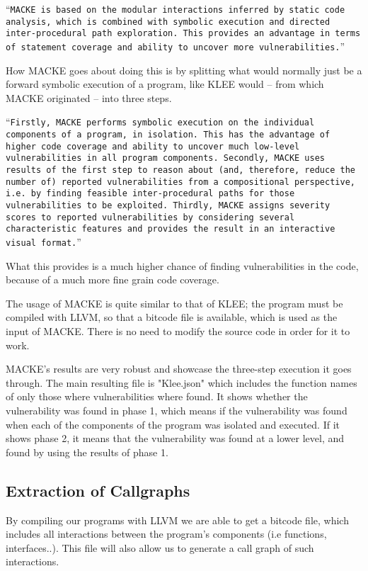 \enquote{\texttt{MACKE is based on the modular interactions inferred
		by static code analysis, which is combined with symbolic execution and directed inter-procedural path exploration. This
		provides an advantage in terms of statement coverage and
		ability to uncover more vulnerabilities.}}\parencite{ognawala}

How MACKE goes about doing this is by splitting what would normally just be a forward symbolic execution of a program, like KLEE would -- from which MACKE originated -- into three steps.

\enquote{\texttt{Firstly,
		MACKE performs symbolic execution on the individual components
		of a program, in isolation. This has the advantage
		of higher code coverage and ability to uncover much low-level
		vulnerabilities in all program components. Secondly,
		MACKE uses results of the first step to reason about (and,
		therefore, reduce the number of) reported vulnerabilities
		from a compositional perspective, i.e. by finding feasible
		inter-procedural paths for those vulnerabilities to be exploited.
		Thirdly, MACKE assigns severity scores to reported
		vulnerabilities by considering several characteristic features
		and provides the result in an interactive visual format.}}\parencite{ognawala}

What this provides is a much higher chance of finding vulnerabilities in the code, because of a much more fine grain code coverage.

The usage of MACKE is quite similar to that of KLEE; the program must be compiled with LLVM, so that a bitcode file is available, which is used as the input of MACKE. There is no need to modify the source code in order for it to work.

MACKE's results are very robust and showcase the three-step execution it goes through. The main resulting file is "Klee.json" which includes the function names of only those where vulnerabilities where found. 
It shows whether the vulnerability was found in phase 1, which means if the vulnerability was found when each of the components of the program was isolated and executed. If it shows phase 2, it means that the vulnerability was found at a lower level, and found by using the results of phase 1. 

\subsection{Extraction of Callgraphs}

By compiling our programs with LLVM we are able to get a bitcode file, which includes all interactions between the program's components (i.e functions, interfaces..). This file will also allow us to generate a call graph of such interactions.

